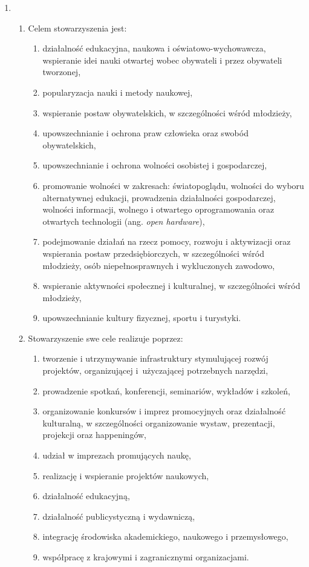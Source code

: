 \documentclass[chapterprefix,notitlepage]{article}
\begin{document}
\begin{enumerate}
	\item \begin{enumerate}
		\item Celem stowarzyszenia jest:
		\begin{enumerate}
			\item działalność edukacyjna, naukowa i oświatowo-wychowawcza, wspieranie idei nauki otwartej wobec obywateli i przez obywateli tworzonej,
			\item popularyzacja nauki i metody naukowej,
			\item wspieranie postaw obywatelskich, w szczególności wśród młodzieży,
			\item upowszechnianie i ochrona praw człowieka oraz swobód obywatelskich,
			\item upowszechnianie i ochrona wolności osobistej i gospodarczej,
			\item promowanie wolności w zakresach: światopoglądu, wolności do wyboru alternatywnej edukacji, prowadzenia działalności gospodarczej, wolności informacji, wolnego i otwartego oprogramowania oraz otwartych technologii (ang. \textit{open hardware}),
			\item podejmowanie działań na rzecz pomocy, rozwoju i aktywizacji oraz wspierania postaw przedsiębiorczych, w szczególności wśród młodzieży, osób niepełnosprawnych i wykluczonych zawodowo,
			\item wspieranie aktywności społecznej i kulturalnej, w szczególności wśród młodzieży,
			\item upowszechnianie kultury fizycznej, sportu i turystyki.
		\end{enumerate}
		\item Stowarzyszenie swe cele realizuje poprzez:
		\begin{enumerate}
			\item tworzenie i utrzymywanie infrastruktury stymulującej rozwój projektów, organizującej i~użyczającej potrzebnych narzędzi,
			\item prowadzenie spotkań, konferencji, seminariów, wykładów i szkoleń,
			\item organizowanie konkursów i imprez promocyjnych oraz działalność kulturalną, w szczególności organizowanie wystaw, prezentacji, projekcji oraz happeningów,
			\item udział w imprezach promujących naukę,
			\item realizację i wspieranie projektów naukowych,
			\item działalność edukacyjną,
			\item działalność publicystyczną i wydawniczą,
			\item integrację środowiska akademickiego, naukowego i przemysłowego,
			\item współpracę z krajowymi i zagranicznymi organizacjami.
		\end{enumerate}
	\end{enumerate}
	

\end{enumerate}
\end{document}
